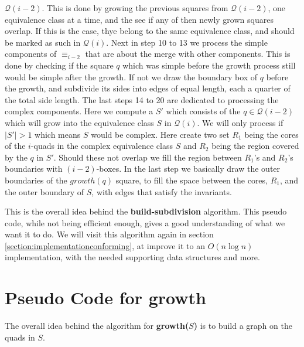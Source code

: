 $\mathcal{Q}(i-2)$. This is done by growing the previous squares from $\mathcal{Q}(i-2)$, one 
equivalence class at a time, and the see if any of then newly grown squares overlap. If this is 
the case, thye belong to the same equivalence class, and should be marked as such in 
$\mathcal{Q}(i)$. Next in step 10 to 13 we process the simple components of $\equiv_{i-2}$ that 
are about the merge with other components. This is done by checking if the square $q$ which was 
simple before the growth process still would be simple after the growth. If not we draw the 
boundary box of $q$ before the growth, and subdivide its sides into edges of equal length, each 
a quarter of the total side length. The last steps 14 to 20 are dedicated to processing the 
complex components. Here we compute a $S'$ which consists of the $q \in \mathcal{Q}(i-2)$ which 
will grow into the equivalence class $S$ in $\mathcal{Q}(i)$. We will only process if $|S'| > 1$ 
which means $S$ would be complex. Here create two set $R_1$ being the cores of the $i$-quads in 
the complex equivalence class $S$ and $R_2$ being the region covered by the $q$ in $S'$. Should 
these not overlap we fill the region between $R_1$'s and $R_2$'s boundaries with $(i-2)$-boxes. 
In the last step we basically draw the outer boundaries of the $growth(q)$ square, to fill the 
space between the cores, $R_1$, and the outer boundary of $S$, with edges that satisfy the 
invariants. 

This is the overall idea behind the \textbf{build-subdivision} algorithm. This pseudo code, 
while not being efficient enough, gives a good understanding of what we want it to do. We will 
visit this algorithm again in section \ref{section:implementationconforming}, at improve it to 
an $O(n \log n)$ implementation, with the needed supporting data structures and more.

\section{Pseudo Code for \textbf{growth}}

The overall idea behind the algorithm for \textbf{growth($S$)} is to build a graph on the quads 
in $S$. 

